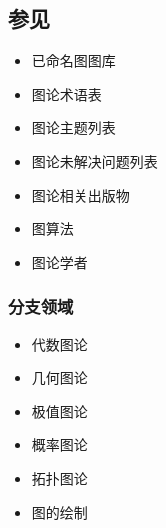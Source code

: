 \subsection{参见}
\begin{itemize}
\item 已命名图图库
\item 图论术语表
\item 图论主题列表
\item 图论未解决问题列表
\item 图论相关出版物
\item 图算法
\item 图论学者
\end{itemize}
\subsubsection{分支领域}
\begin{itemize}
\item 代数图论
\item 几何图论
\item 极值图论
\item 概率图论
\item 拓扑图论
\item 图的绘制
\end{itemize}
